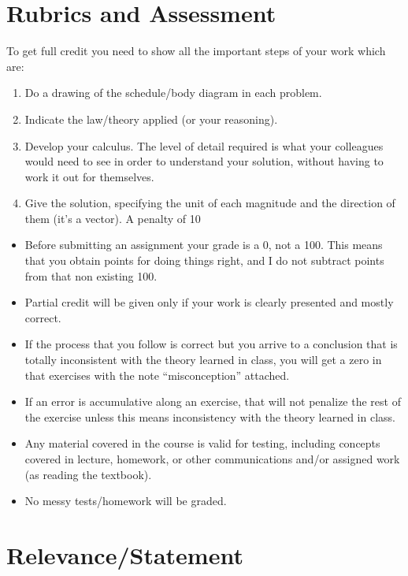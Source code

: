 \documentclass[12pt]{article}
\begin{document}
\section*{Rubrics and Assessment}

To get full credit you need to show all the important steps of your work which are:

\begin{enumerate}
\item Do a drawing of the schedule/body diagram in each problem.
\item Indicate the law/theory applied (or your reasoning).
\item Develop your calculus. The level of detail required is what your colleagues would need to see in order to understand your solution, without having to 
work it out for themselves.
\item Give the solution, specifying the unit of each magnitude and the direction of them (it's a vector). A penalty of 10%
\end{enumerate}

\begin{itemize}
\item Before submitting an assignment your grade is a 0, not a 100. This means that you obtain points for doing things right, and I do not subtract points from 
that non existing 100. 
\item Partial credit will be given only if your work is clearly presented and mostly correct.
\item If the process that you follow is correct but you arrive to a conclusion that is totally inconsistent with the theory learned in class, you will get a zero
 in that exercises with the note “misconception” attached. 
\item If an error is accumulative along an exercise, that will not penalize the rest of the exercise unless this means inconsistency with the theory learned in 
class. 
\item Any material covered in the course is valid for testing, including concepts covered in lecture, homework, or other communications and/or assigned work 
(as reading the textbook).
\item No messy tests/homework will be graded.
\end{itemize}

\section*{Relevance/Statement}
\end{document}
